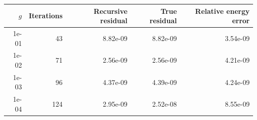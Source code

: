 \begin{tabular}{rrrrr}
\toprule
$g$ & Iterations & Recursive residual & True residual & Relative energy error\\
\midrule
1e-01 & 43 & 8.82e-09 & 8.82e-09 & 3.54e-09 \\
1e-02 & 71 & 2.56e-09 & 2.56e-09 & 4.21e-09 \\
1e-03 & 96 & 4.37e-09 & 4.39e-09 & 4.24e-09 \\
1e-04 & 124 & 2.95e-09 & 2.52e-08 & 8.55e-09 \\
\bottomrule
\end{tabular}
